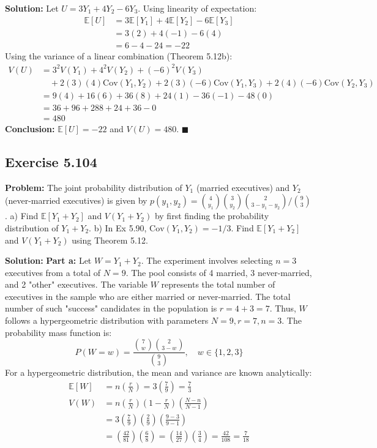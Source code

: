 \documentclass[11pt, a4paper]{article}
\theoremstyle{definition}
\theoremstyle{remark}
\newcommand{\E}{\mathbb{E}}
\begin{document}
\textbf{Solution:}
Let $U = 3Y_1 + 4Y_2 - 6Y_3$.
Using linearity of expectation:
\begin{align*}
\E[U] &= 3\E[Y_1] + 4\E[Y_2] - 6\E[Y_3] \\
&= 3(2) + 4(-1) - 6(4) \\
&= 6 - 4 - 24 = -22
\end{align*}
Using the variance of a linear combination (Theorem 5.12b):
\begin{align*}
V(U) &= 3^2 V(Y_1) + 4^2 V(Y_2) + (-6)^2 V(Y_3) \\
&\quad + 2(3)(4)\text{Cov}(Y_1,Y_2) + 2(3)(-6)\text{Cov}(Y_1,Y_3) + 2(4)(-6)\text{Cov}(Y_2,Y_3) \\
&= 9(4) + 16(6) + 36(8) + 24(1) - 36(-1) - 48(0) \\
&= 36 + 96 + 288 + 24 + 36 - 0 \\
&= 480
\end{align*}
\textbf{Conclusion:} $\E[U] = -22$ and $V(U) = 480$. $\blacksquare$

\subsection{Exercise 5.104}
\textbf{Problem:} The joint probability distribution of $Y_1$ (married executives) and $Y_2$ (never-married executives) is given by $p(y_1, y_2) = \binom{4}{y_1}\binom{3}{y_2}\binom{2}{3-y_1-y_2} / \binom{9}{3}$.
a) Find $\E[Y_1+Y_2]$ and $V(Y_1+Y_2)$ by first finding the probability distribution of $Y_1+Y_2$.
b) In Ex 5.90, $\text{Cov}(Y_1,Y_2) = -1/3$. Find $\E[Y_1+Y_2]$ and $V(Y_1+Y_2)$ using Theorem 5.12.

\textbf{Solution:}
\textbf{Part a:} Let $W = Y_1 + Y_2$. The experiment involves selecting $n=3$ executives from a total of $N=9$. The pool consists of 4 married, 3 never-married, and 2 "other" executives. The variable $W$ represents the total number of executives in the sample who are either married or never-married. The total number of such "success" candidates in the population is $r = 4 + 3 = 7$.
Thus, $W$ follows a hypergeometric distribution with parameters $N=9, r=7, n=3$.
The probability mass function is:
\[ P(W = w) = \frac{\binom{7}{w}\binom{2}{3-w}}{\binom{9}{3}}, \quad w \in \{1, 2, 3\} \]
For a hypergeometric distribution, the mean and variance are known analytically:
\begin{align*}
\E[W] &= n \left(\frac{r}{N}\right) = 3 \left(\frac{7}{9}\right) = \frac{7}{3} \\
V(W) &= n \left(\frac{r}{N}\right) \left(1 - \frac{r}{N}\right) \left(\frac{N-n}{N-1}\right) \\
&= 3 \left(\frac{7}{9}\right) \left(\frac{2}{9}\right) \left(\frac{9-3}{9-1}\right) \\
&= \left(\frac{42}{81}\right) \left(\frac{6}{8}\right) = \left(\frac{14}{27}\right) \left(\frac{3}{4}\right) = \frac{42}{108} = \frac{7}{18}
\end{align*}
\end{document}

